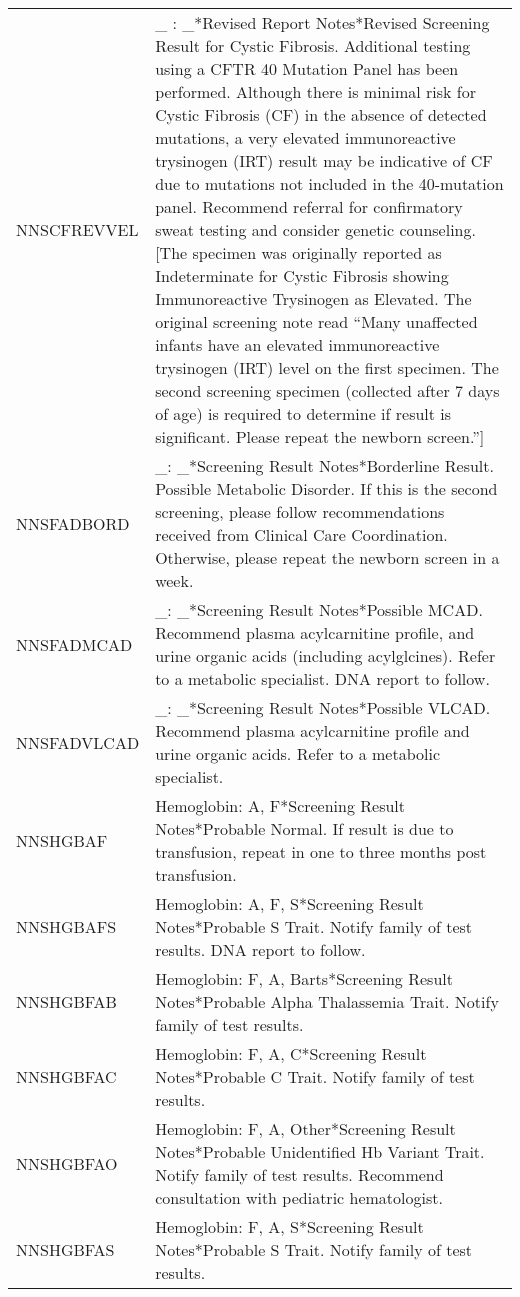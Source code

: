 \begin{fullwidth}
\begin{longtable}{p{.20\linewidth} p{.75\linewidth}}
NNSCFREVVEL  & \_ : \_*Revised Report Notes*Revised Screening Result for Cystic Fibrosis. Additional testing using a CFTR 40 Mutation Panel has been performed. Although there is minimal risk for Cystic Fibrosis (CF) in the absence of detected mutations, a very elevated immunoreactive trysinogen (IRT) result may be indicative of CF due to mutations not included in the 40-mutation panel. Recommend referral for confirmatory sweat testing and consider genetic counseling. [The specimen was originally reported as Indeterminate for Cystic Fibrosis showing Immunoreactive Trysinogen as Elevated. The original screening note read “Many unaffected infants have an elevated immunoreactive trysinogen (IRT) level on the first specimen. The second screening specimen (collected after 7 days of age) is required to determine if result is significant. Please repeat the newborn screen.”]\\
NNSFADBORD   & \_: \_*Screening Result Notes*Borderline Result. Possible Metabolic Disorder. If this is the second screening, please follow recommendations received from Clinical Care Coordination. Otherwise, please repeat the newborn screen in a week.\\
NNSFADMCAD   & \_: \_*Screening Result Notes*Possible MCAD. Recommend plasma acylcarnitine profile, and urine organic acids (including acylglcines). Refer to a metabolic specialist. DNA report to follow.\\
NNSFADVLCAD  & \_: \_*Screening Result Notes*Possible VLCAD. Recommend plasma acylcarnitine profile and urine organic acids. Refer to a metabolic specialist.\\
NNSHGBAF     & Hemoglobin:  A, F*Screening Result Notes*Probable Normal. If result is due to transfusion, repeat in one to three months post transfusion.\\
NNSHGBAFS    & Hemoglobin: A, F, S*Screening Result Notes*Probable S Trait. Notify family of test results. DNA report to follow.\\
NNSHGBFAB    & Hemoglobin: F, A, Barts*Screening Result Notes*Probable Alpha Thalassemia Trait. Notify family of test results.\\
NNSHGBFAC    & Hemoglobin: F, A, C*Screening Result Notes*Probable C Trait. Notify family of test results.\\
NNSHGBFAO    & Hemoglobin: F, A, Other*Screening Result Notes*Probable Unidentified Hb Variant Trait. Notify family of test results. Recommend consultation with pediatric hematologist.\\
NNSHGBFAS    & Hemoglobin: F, A, S*Screening Result Notes*Probable S Trait. Notify family of test results.\\

\end{longtable}
\end{fullwidth}
